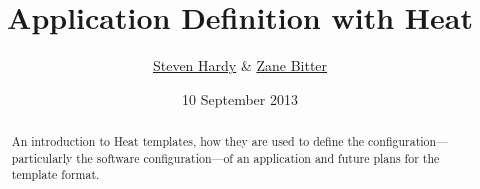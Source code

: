 \documentclass{tufte-handout}
\title{Application Definition with Heat}
\author{\href{mailto:shardy@redhat.com}{Steven Hardy} \& \href{mailto:zbitter@redhat.com}{Zane Bitter}}
\date{10 September 2013}
\begin{document}
\maketitle

\marginnote{\tableofcontents \vspace{2em}}

\begin{abstract}
An introduction to Heat templates, how they are used to define the configuration---particularly the software configuration---of an application and future plans for the template format.
\end{abstract}












\end{document}

